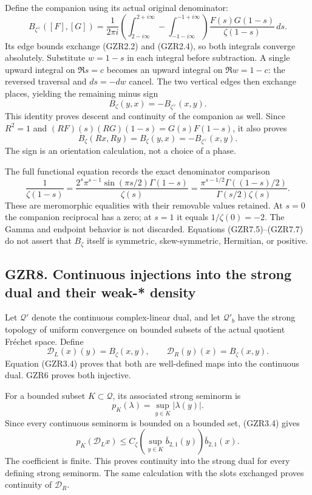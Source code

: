 Define the companion using its actual original denominator: \[
B_{\zeta^\vee}([F],[G])=
\frac1{2\pi i}
\left(
\int_{2-i\infty}^{2+i\infty}
-\int_{-1-i\infty}^{-1+i\infty}
\right)
\frac{F(s)G(1-s)}{\zeta(1-s)}\,ds .
\tag{GZR7.4}
\] Its edge bounds exchange (GZR2.2) and (GZR2.4), so both integrals
converge absolutely. Substitute \(w=1-s\) in each integral before
subtraction. A single upward integral on \(\Re s=c\) becomes an upward
integral on \(\Re w=1-c\): the reversed traversal and \(ds=-dw\) cancel.
The two vertical edges then exchange places, yielding the remaining
minus sign \[
\boxed{\ B_\zeta(y,x)=-B_{\zeta^\vee}(x,y).\ }
\tag{GZR7.5}
\] This identity proves descent and continuity of the companion as well.
Since \(R^2=1\) and \((RF)(s)(RG)(1-s)=G(s)F(1-s)\), it also proves \[
B_\zeta(Rx,Ry)=B_\zeta(y,x)=-B_{\zeta^\vee}(x,y).
\tag{GZR7.6}
\] The sign is an orientation calculation, not a choice of a phase.

The full functional equation records the exact denominator comparison \[
\frac1{\zeta(1-s)}
=\frac{2^s\pi^{s-1}\sin(\pi s/2)\Gamma(1-s)}{\zeta(s)}
=\frac{\pi^{s-1/2}\Gamma((1-s)/2)}
{\Gamma(s/2)\zeta(s)}.
\tag{GZR7.7}
\] These are meromorphic equalities with their removable values
retained. At \(s=0\) the companion reciprocal has a zero; at \(s=1\) it
equals \(1/\zeta(0)=-2\). The Gamma and endpoint behavior is not
discarded. Equations (GZR7.5)--(GZR7.7) do not assert that \(B_\zeta\)
itself is symmetric, skew-symmetric, Hermitian, or positive.

\subsection{GZR8. Continuous injections into the strong dual and their
weak-*
density}\label{gzr8.-continuous-injections-into-the-strong-dual-and-their-weak--density}

Let \(\mathcal Q'\) denote the continuous complex-linear dual, and let
\(\mathcal Q'_b\) have the strong topology of uniform convergence on
bounded subsets of the actual quotient Fréchet space. Define \[
\mathcal D_L(x)(y)=B_\zeta(x,y),\qquad
\mathcal D_R(y)(x)=B_\zeta(x,y).
\tag{GZR8.1}
\] Equation (GZR3.4) proves that both are well-defined maps into the
continuous dual. GZR6 proves both injective.

For a bounded subset \(K\subset\mathcal Q\), its associated strong
seminorm is \[
p_K(\lambda)=\sup_{y\in K}|\lambda(y)|.
\] Since every continuous seminorm is bounded on a bounded set, (GZR3.4)
gives \[
p_K(\mathcal D_Lx)
\le C_\zeta\left(\sup_{y\in K}\bar b_{2,1}(y)\right)
\bar b_{2,1}(x).
\tag{GZR8.2}
\] The coefficient is finite. This proves continuity into the strong
dual for every defining strong seminorm. The same calculation with the
slots exchanged proves continuity of \(\mathcal D_R\).

